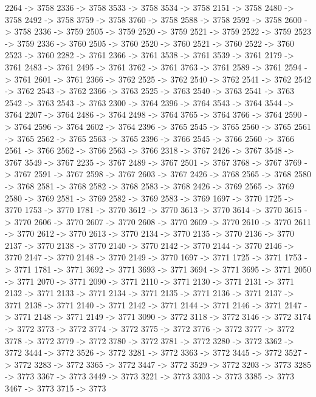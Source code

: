 {	2264 -> 3758
	2336 -> 3758
	3533 -> 3758
	3534 -> 3758
	2151 -> 3758
	2480 -> 3758
	2492 -> 3758
	3759 -> 3758
	3760 -> 3758
	2588 -> 3758
	2592 -> 3758
	2600 -> 3758
	2336 -> 3759
	2505 -> 3759
	2520 -> 3759
	2521 -> 3759
	2522 -> 3759
	2523 -> 3759
	2336 -> 3760
	2505 -> 3760
	2520 -> 3760
	2521 -> 3760
	2522 -> 3760
	2523 -> 3760
	2282 -> 3761
	2366 -> 3761
	3538 -> 3761
	3539 -> 3761
	2179 -> 3761
	2483 -> 3761
	2495 -> 3761
	3762 -> 3761
	3763 -> 3761
	2589 -> 3761
	2594 -> 3761
	2601 -> 3761
	2366 -> 3762
	2525 -> 3762
	2540 -> 3762
	2541 -> 3762
	2542 -> 3762
	2543 -> 3762
	2366 -> 3763
	2525 -> 3763
	2540 -> 3763
	2541 -> 3763
	2542 -> 3763
	2543 -> 3763
	2300 -> 3764
	2396 -> 3764
	3543 -> 3764
	3544 -> 3764
	2207 -> 3764
	2486 -> 3764
	2498 -> 3764
	3765 -> 3764
	3766 -> 3764
	2590 -> 3764
	2596 -> 3764
	2602 -> 3764
	2396 -> 3765
	2545 -> 3765
	2560 -> 3765
	2561 -> 3765
	2562 -> 3765
	2563 -> 3765
	2396 -> 3766
	2545 -> 3766
	2560 -> 3766
	2561 -> 3766
	2562 -> 3766
	2563 -> 3766
	2318 -> 3767
	2426 -> 3767
	3548 -> 3767
	3549 -> 3767
	2235 -> 3767
	2489 -> 3767
	2501 -> 3767
	3768 -> 3767
	3769 -> 3767
	2591 -> 3767
	2598 -> 3767
	2603 -> 3767
	2426 -> 3768
	2565 -> 3768
	2580 -> 3768
	2581 -> 3768
	2582 -> 3768
	2583 -> 3768
	2426 -> 3769
	2565 -> 3769
	2580 -> 3769
	2581 -> 3769
	2582 -> 3769
	2583 -> 3769
	1697 -> 3770
	1725 -> 3770
	1753 -> 3770
	1781 -> 3770
	3612 -> 3770
	3613 -> 3770
	3614 -> 3770
	3615 -> 3770
	2606 -> 3770
	2607 -> 3770
	2608 -> 3770
	2609 -> 3770
	2610 -> 3770
	2611 -> 3770
	2612 -> 3770
	2613 -> 3770
	2134 -> 3770
	2135 -> 3770
	2136 -> 3770
	2137 -> 3770
	2138 -> 3770
	2140 -> 3770
	2142 -> 3770
	2144 -> 3770
	2146 -> 3770
	2147 -> 3770
	2148 -> 3770
	2149 -> 3770
	1697 -> 3771
	1725 -> 3771
	1753 -> 3771
	1781 -> 3771
	3692 -> 3771
	3693 -> 3771
	3694 -> 3771
	3695 -> 3771
	2050 -> 3771
	2070 -> 3771
	2090 -> 3771
	2110 -> 3771
	2130 -> 3771
	2131 -> 3771
	2132 -> 3771
	2133 -> 3771
	2134 -> 3771
	2135 -> 3771
	2136 -> 3771
	2137 -> 3771
	2138 -> 3771
	2140 -> 3771
	2142 -> 3771
	2144 -> 3771
	2146 -> 3771
	2147 -> 3771
	2148 -> 3771
	2149 -> 3771
	3090 -> 3772
	3118 -> 3772
	3146 -> 3772
	3174 -> 3772
	3773 -> 3772
	3774 -> 3772
	3775 -> 3772
	3776 -> 3772
	3777 -> 3772
	3778 -> 3772
	3779 -> 3772
	3780 -> 3772
	3781 -> 3772
	3280 -> 3772
	3362 -> 3772
	3444 -> 3772
	3526 -> 3772
	3281 -> 3772
	3363 -> 3772
	3445 -> 3772
	3527 -> 3772
	3283 -> 3772
	3365 -> 3772
	3447 -> 3772
	3529 -> 3772
	3203 -> 3773
	3285 -> 3773
	3367 -> 3773
	3449 -> 3773
	3221 -> 3773
	3303 -> 3773
	3385 -> 3773
	3467 -> 3773
	3715 -> 3773
}
